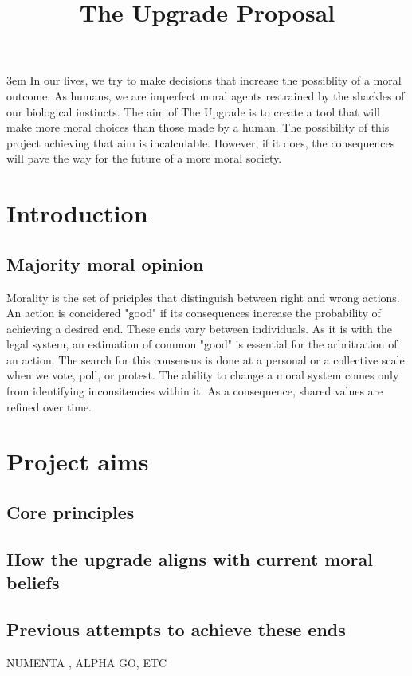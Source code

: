 \documentclass[12pt]{article}
\title{The Upgrade Proposal}
\date{\vspace{-5ex}}
\author{\vspace{-5ex}}
\begin{document}
\maketitle
\par
\begingroup
\leftskip3em
\rightskip\leftskip
In our lives, we try to make decisions that increase the possiblity of a moral outcome. As humans, we are imperfect moral agents restrained by the shackles of our biological instincts. The aim of The Upgrade is to create a tool that will make more moral choices than those made by a human. The possibility of this project achieving that aim is incalculable. However, if it does, the consequences will pave the way for the future of a more moral society.
\par
\endgroup
\newpage

\section*{Introduction}
\subsection*{Majority moral opinion}
Morality is the set of priciples that distinguish between right and wrong actions. An action is concidered "good" if its consequences increase the probability of achieving a desired end. These ends vary between individuals. As it is with the legal system, an estimation of common "good" is essential for the arbritration of an action. The search for this consensus is done at a personal or a collective scale when we vote, poll, or protest. The ability to change a moral system comes only from identifying inconsitencies within it. As a consequence, shared values are refined over time.

\section*{Project aims}
\subsection*{Core principles}
\subsection*{How the upgrade aligns with current moral beliefs}
\subsection*{Previous attempts to achieve these ends}
NUMENTA \cite{numentahome}, ALPHA GO, ETC
\end{document}
